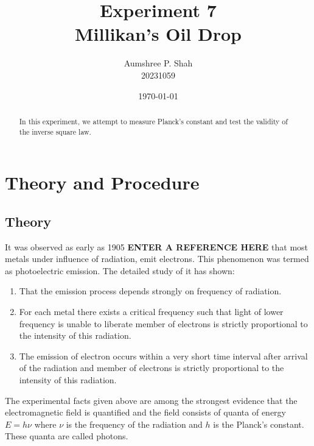 \documentclass[%
 sor,
 jor,
 amsmath,amssymb,
 reprint,%
]{revtex4-2}
\begin{document}

\title{Experiment 7\\Millikan's Oil Drop}

\author{Aumshree P. Shah\\20231059\color{red}}
\altaffiliation[\color{red}]{aumshree.pinkalbenshah@students.iiserpune.ac.in}
\date{\today}
\vspace{1cm}
\begin{abstract}
\centering
In this experiment, we attempt to measure Planck's constant and test the validity of the inverse square law.
\end{abstract}
\maketitle
\section{Theory and Procedure}
\subsection{Theory}
It was observed as early as 1905 \textbf{ENTER A REFERENCE HERE} that most metals under influence of radiation, emit electrons. This phenomenon was termed as photoelectric emission. The detailed study of it has shown:
\begin{enumerate}
  \item That the emission process depends strongly on frequency of radiation.
  \item For each metal there exists a critical frequency such that light of lower frequency is unable to liberate member of electrons is strictly proportional to the intensity of this radiation.
  \item The emission of electron occurs within a very short time interval after arrival of the radiation and member of electrons is strictly proportional to the intensity of this radiation. 
\end{enumerate}
The experimental facts given above are among the strongest evidence that the electromagnetic field is quantified and the field consists of quanta of energy $E = h \nu$ where $\nu$ is the frequency of the radiation and $h$ is the Planck’s constant. These quanta are called photons. \\
\end{document}
